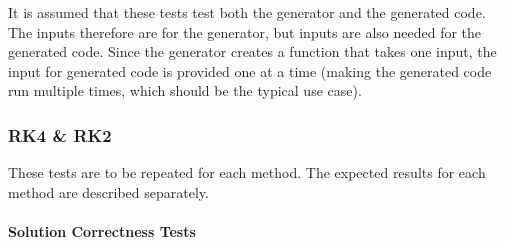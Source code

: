 \documentclass[12pt, titlepage]{article}
\begin{document}
It is assumed that these tests test both the generator and the generated code. 
The inputs therefore are for the generator, but inputs are also needed for the 
generated code. Since the generator creates a function that takes one input, 
the input for generated code is provided one at a time (making the generated 
code run multiple times, which should be the typical use case).

\subsubsection{RK4 \& RK2}
These tests are to be repeated for each method. The expected results for each 
method are described separately.

\paragraph{Solution Correctness Tests}
\end{document}
